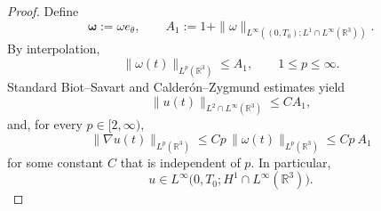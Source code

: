 \documentclass[reqno,11pt]{amsart}
\begin{document}
\begin{proof}
Define
\[
\boldsymbol{\omega}:=\omega e_\theta, 
\qquad A_1:=1+\|\omega\|_{L^\infty((0,T_0);L^1\cap L^\infty(\mathbb R^3))}.
\]
By interpolation,
\[
\|\omega(t)\|_{L^p(\mathbb R^3)}\le A_1,
\qquad 1\le p\le \infty.
\]
Standard Biot--Savart and Calder\'on--Zygmund estimates yield
\begin{equation}
\label{eq:uniq_est_u}
\|u(t)\|_{L^2\cap L^\infty(\mathbb R^3)}\le CA_1,
\end{equation}
and, for every $p\in[2,\infty)$,
\begin{equation}
\label{eq:uniq_est_grad_u}
\|\nabla u(t)\|_{L^p(\mathbb R^3)}
\le C p\,\|\omega(t)\|_{L^p(\mathbb R^3)}
\le C p\ A_1
\end{equation}
for some constant $C$ that is independent of $p$.
In particular,
\[
u\in L^\infty\big(0,T_0;H^1\cap L^\infty(\mathbb R^3)\big).
\]


\end{proof}
\end{document}
